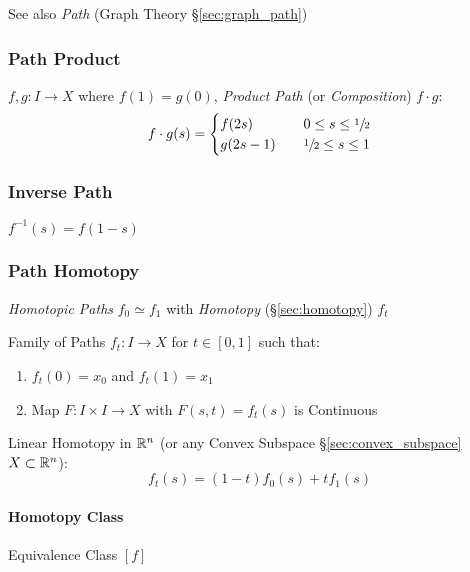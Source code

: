 \fist See also \emph{Path} (Graph Theory \S\ref{sec:graph_path})



\subsubsection{Path Product}\label{sec:path_product}

$f,g : I \rightarrow X$ where $f(1) = g(0)$, \emph{Product Path} (or
\emph{Composition}) $f \cdot g$:
\[
  f \cdot g (s) =
  \begin{cases}
    f(2s)   & \quad 0 \leq s \leq \sfrac{1}{2} \\
    g(2s-1) & \quad \sfrac{1}{2} \leq s \leq 1 \\
  \end{cases}
\]



\subsubsection{Inverse Path}\label{sec:inverse_path}

$f^{-1}(s) = f(1-s)$



\subsubsection{Path Homotopy}\label{sec:path_homotopy}

\emph{Homotopic Paths} $f_0 \simeq f_1$ with \emph{Homotopy}
(\S\ref{sec:homotopy}) $f_t$

Family of Paths $f_t : I \rightarrow X$ for $t \in [0,1]$ such that:
\begin{enumerate}
  \item $f_t(0) = x_0$ and $f_t(1) = x_1$
  \item Map $F : I \times I \rightarrow X$ with $F(s,t) = f_t(s)$ is
    Continuous
\end{enumerate}

Linear Homotopy in $\mathbb{R}^n$ (or any Convex Subspace
\S\ref{sec:convex_subspace} $X \subset \mathbb{R}^n$):
\[
  f_t(s) = (1 - t) f_0(s) + t f_1(s)
\]



\paragraph{Homotopy Class}\label{sec:homotopy_class}\hfill

Equivalence Class $[f]$

